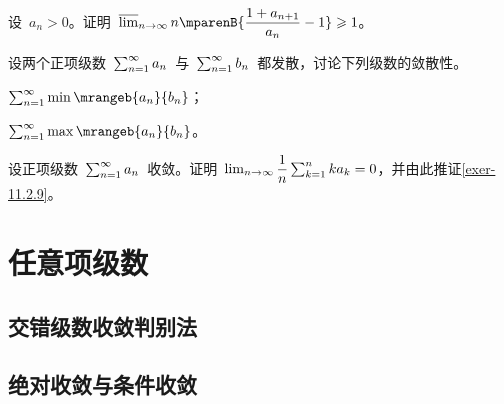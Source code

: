 \begin{exercise}
\item 设~$a_n>0$。证明~$\limsup_\ntoinf n\mparenB{\dfrac{1+a_{n+1}}{a_n}-1}\geq1$。
\item 设两个正项级数~$\sum_{n=1}^\infty a_n$~与~$\sum_{n=1}^\infty b_n$~都发散，讨论下列级数的敛散性。
\begin{exlistcols}
  \item $\sum_{n=1}^\sinf\min\mrangeb{a_n}{b_n}$；
  \item $\sum_{n=1}^\sinf\max\mrangeb{a_n}{b_n}$。
\end{exlistcols}
\item 设正项级数~$\sum_{n=1}^\infty a_n$~收敛。证明~$\lim_{n\to\infty}\dfrac1n\sum_{k=1}^nka_k=0$，并由此推证\ref{exer-11.2.9}。
\end{exercise}

\section{任意项级数}
\subsection{交错级数收敛判别法}
\subsection{绝对收敛与条件收敛}
